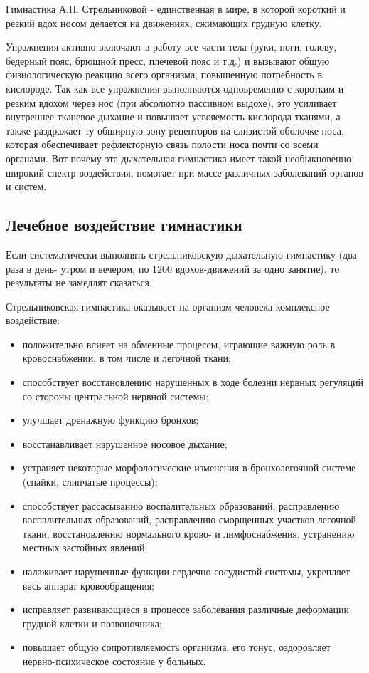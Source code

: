 \documentclass[a4paper]{article}
\begin{document}
    Гимнастика А.Н. Стрельниковой - единственная в мире, в которой короткий и резкий вдох носом делается на движениях, сжимающих грудную клетку.

    Упражнения активно включают в работу все части тела (руки, ноги, голову, бедерный пояс, брюшной пресс, плечевой пояс и т.д.) и вызывают общую физиологическую реакцию всего организма, повышенную потребность в кислороде. Так как все упражнения выполняются одновременно с коротким и резким вдохом через нос (при абсолютно пассивном выдохе), это усиливает внутреннее тканевое дыхание и повышает усвояемость кислорода тканями, а также раздражает ту обширную зону рецепторов на слизистой оболочке носа, которая обеспечивает рефлекторную связь полости носа почти со всеми органами. Вот почему эта дыхательная гимнастика имеет такой необыкновенно широкий спектр воздействия, помогает при массе различных заболеваний органов и систем.

    \subsection{Лечебное воздействие гимнастики}
    Если систематически выполнять стрельниковскую дыхательную гимнастику (два раза в день- утром и вечером, по 1200 вдохов-движений за одно занятие), то результаты не замедлят сказаться.

    Стрельниковская гимнастика оказывает на организм человека комплексное воздействие:
    \begin{itemize}
        \item положительно влияет на обменные процессы, играющие важную роль в кровоснабжении, в том числе и легочной ткани;
        \item способствует восстановлению нарушенных в ходе болезни нервных регуляций со стороны центральной нервной системы;
        \item улучшает дренажную функцию бронхов;
        \item восстанавливает нарушенное носовое дыхание;
        \item устраняет некоторые морфологические изменения в бронхолегочной системе (спайки, слипчатые процессы);
        \item способствует рассасыванию воспалительных образований, расправлению воспалительных образований, расправлению сморщенных участков легочной ткани, восстановлению нормального крово- и лимфоснабжения, устранению местных застойных явлений;
        \item налаживает нарушенные функции сердечно-сосудистой системы, укрепляет весь аппарат кровообращения;
        \item исправляет развивающиеся в процессе заболевания различные деформации грудной клетки и позвоночника;
        \item повышает общую сопротивляемость организма, его тонус, оздоровляет нервно-психическое состояние у больных.
    \end{itemize}
\end{document}
